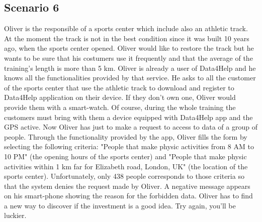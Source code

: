     \subsection{Scenario 6}
    Oliver is the responsible of a sports center which include also an athletic track.
    At the moment the track is not in the best condition since it was built 10 years ago, when the sports center opened.
    Oliver would like to restore the track but he wants to be sure that his costumers use it frequently and that the average of the training's length is more than 5 km.
    Oliver is already a user of Data4Help and he knows all the functionalities provided by that service. He asks to all the customer of the sports center that use the athletic track to download and register to Data4Help application on their device. If they don't own one, Oliver would provide them with a smart-watch.
    Of course, during the whole training the customers must bring with them a device equipped with Data4Help app and the GPS active.
    Now Oliver has just to make a request to access to data of a group of people. Through the functionality provided by the app, Oliver fills the form by selecting the following criteria: "People that make physic activities from 8 AM to 10 PM" (the opening hours of the sports center) and "People that make physic activities within 1 km far for Elizabeth road, London, UK" (the location of the sports center).
    Unfortunately, only 438 people corresponds to those criteria so that the system denies the request made by Oliver.
    A negative message appears on his smart-phone showing the reason for the forbidden data.
    Oliver has to find a new way to discover if the investment is a good idea.
    Try again, you'll be luckier.
    

